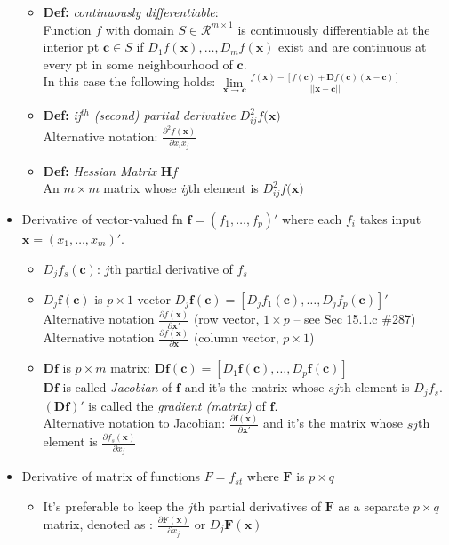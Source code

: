 \documentclass[a4paper]{article}
\newcommand{\mb}{\mathbf}
\begin{document}
\begin{itemize}
\begin{itemize}
\item \textbf{Def: } \textit{continuously differentiable}: \\
Function $f$ with domain $S\in \mathcal{R}^{m\times 1}$ is continuously differentiable at the interior pt $\mathbf{c}\in S$ if $D_1f(\mathbf{x}),\hdots, D_mf(\mathbf{x})$ exist and are continuous at every pt in some neighbourhood of $\mathbf{c}$.\\
In this case the following holds: $\lim\limits_{\mathbf{x}\to\mathbf{c}} \frac{f(\mathbf{x})-[f(\mathbf{c})+\mathbf{D}f(\mathbf{c})(\mathbf{x-c})]}{||\mathbf{x-c}||}$

\item \textbf{Def:} \textit{ij}$^{th}$ \textit{(second) partial derivative}
$D_{ij}^2f(\mathbf{x)}$ \\
Alternative notation: $\frac{\partial^2 f(\mathbf{x})}{\partial x_i x_j}$
\item \textbf{Def:} \textit{Hessian Matrix} $\mathbf{H}f$\\
An $m\times m$ matrix whose \textit{ij}th element is $D_{ij}^2f(\mathbf{x)}$
\end{itemize}
\item Derivative of vector-valued fn $\mathbf{f}=(f_1,\hdots,f_p)'$ where each $f_i$ takes input $\mathbf{x}=(x_1,\hdots,x_m)'$.
\begin{itemize}
	\item $D_jf_s(\mathbf{c})$: $j$th partial derivative of $f_s$
	\item $D_j\mathbf{f(c)}$ is $p\times 1$ vector $D_j\mathbf{f(c)}=[D_jf_1(\mathbf{c}), \hdots, D_jf_p(\mathbf{c})]'$ \\
	Alternative notation $\frac{\partial f(\mathbf{x})}{\partial\mathbf{x}'}$ (row vector, $1\times p$ \--- see Sec 15.1.c \#287) \\
	Alternative notation $\frac{\partial f(\mathbf{x})}{\partial\mathbf{x}}$ (column vector, $p\times 1$)
	\item $\mathbf{Df}$ is $p\times m$ matrix: $\mathbf{Df(c)}=[D_1\mathbf{f(c)}, \hdots, D_p\mathbf{f(c)}]$\\
	$\mathbf{Df}$ is called \textit{Jacobian} of $\mathbf{f}$ and it's the matrix whose $sj$th element is $D_jf_s$. \\
	$(\mathbf{Df})'$ is called the \textit{gradient (matrix)} of $\mathbf{f}$. \\ 
	Alternative notation to Jacobian: $\frac{\partial\mathbf{f(x)}}{\partial \mathbf{x}'}$ and it's the matrix whose $sj$th element is $\frac{\partial f_s(\mathbf{x})}{\partial x_j}$
\end{itemize}
\item Derivative of matrix of functions $F={f_{st}}$ where $\mathbf{F}$ is $p\times q$
\begin{itemize}
\item It's preferable to keep the $j$th partial derivatives of $\mathbf{F}$ as a separate $p\times q$ matrix, denoted as :
$\frac{\partial\mb{F}(\mb{x})}{\partial x_j}$ or $D_j\mb{F(x)}$
\end{itemize}
\end{itemize}
\end{document}
